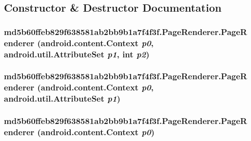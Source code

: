 \subsection{Constructor \& Destructor Documentation}
\hypertarget{classmd5b60ffeb829f638581ab2bb9b1a7f4f3f_1_1_page_renderer_cb75aacbb9b00a0617d2f6d02687172b}{
\subsubsection[{PageRenderer}]{\setlength{\rightskip}{0pt plus 5cm}md5b60ffeb829f638581ab2bb9b1a7f4f3f.PageRenderer.PageRenderer (android.content.Context {\em p0}, \/  android.util.AttributeSet {\em p1}, \/  int {\em p2})}}
\label{classmd5b60ffeb829f638581ab2bb9b1a7f4f3f_1_1_page_renderer_cb75aacbb9b00a0617d2f6d02687172b}


\hypertarget{classmd5b60ffeb829f638581ab2bb9b1a7f4f3f_1_1_page_renderer_451203d230b83724610cc6a9c0ff6d27}{
\subsubsection[{PageRenderer}]{\setlength{\rightskip}{0pt plus 5cm}md5b60ffeb829f638581ab2bb9b1a7f4f3f.PageRenderer.PageRenderer (android.content.Context {\em p0}, \/  android.util.AttributeSet {\em p1})}}
\label{classmd5b60ffeb829f638581ab2bb9b1a7f4f3f_1_1_page_renderer_451203d230b83724610cc6a9c0ff6d27}


\hypertarget{classmd5b60ffeb829f638581ab2bb9b1a7f4f3f_1_1_page_renderer_fd644ee1ae548adf52a3129fc8384a4d}{
\subsubsection[{PageRenderer}]{\setlength{\rightskip}{0pt plus 5cm}md5b60ffeb829f638581ab2bb9b1a7f4f3f.PageRenderer.PageRenderer (android.content.Context {\em p0})}}
\label{classmd5b60ffeb829f638581ab2bb9b1a7f4f3f_1_1_page_renderer_fd644ee1ae548adf52a3129fc8384a4d}




